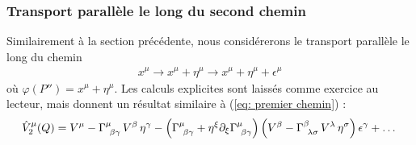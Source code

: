 \subsubsection{Transport parallèle le long du second chemin}
Similairement à la section précédente, nous considérerons le transport parallèle le long du chemin
\begin{align}
        x^\mu \rightarrow x^\mu+\eta^\mu \rightarrow  x^\mu + \eta^\mu + \epsilon^\mu
\end{align}
où $\varphi(P'') = x^\mu+\eta^\mu$. Les calculs explicites sont laissés comme exercice au lecteur, mais donnent un résultat similaire à (\ref{eq: premier chemin}) :
\begin{equation}
    \label{eq: second chemin}
    \hat{V}^\mu_2 (Q) = V^\mu - \Gamma\indices{^\mu_{\!\beta \gamma}}  \, V^\beta \, \eta^\gamma - \lt \Gamma\indices{^\mu_{\!\beta \gamma}} + \eta^\xi \pd_\xi \Gamma\indices{^\mu_{\!\beta \gamma}} \rt \lt V^\beta - \Gamma\indices{^\beta_{\!\lambda \sigma}} \, V^\lambda \, \eta^\sigma \rt \epsilon^\gamma +  \dots
\end{equation} 
